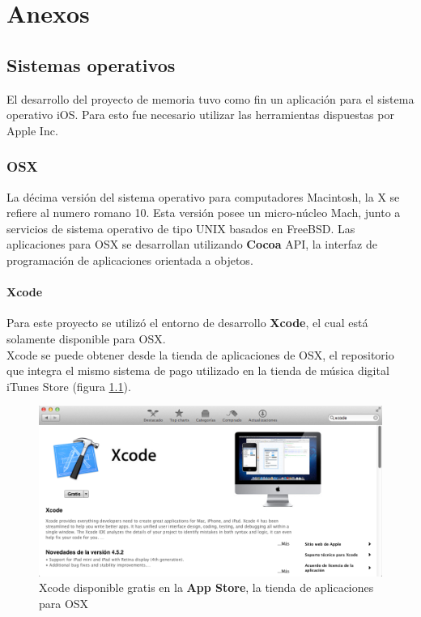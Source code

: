 \chapter{Anexos}
	\section{Sistemas operativos}
	El desarrollo del proyecto de memoria tuvo como fin un aplicación para el sistema operativo iOS. Para esto fue necesario utilizar las herramientas dispuestas por Apple Inc.
		\subsection{OSX}
La décima versión del sistema operativo para computadores Macintosh, la X se refiere al numero romano 10. Esta versión posee un micro-núcleo Mach, junto a servicios de sistema operativo de tipo UNIX basados en FreeBSD.
Las aplicaciones para OSX se desarrollan utilizando \textbf{Cocoa} API, la interfaz de programación de aplicaciones orientada a objetos.
\subsubsection{Xcode}
Para este proyecto se utilizó el entorno de desarrollo \textbf{Xcode}, el cual está solamente disponible para OSX.\\

Xcode se puede obtener desde la tienda de aplicaciones de OSX, el repositorio que integra el mismo sistema de pago utilizado en la tienda de música digital iTunes Store (figura \ref{fig:xcode-appstore}).
\begin{figure}[H]
	\centering
	\includegraphics[scale=0.41]{imgs/xcode-appstore.png} 
	\caption{Xcode disponible gratis en la \textbf{App Store}, la tienda de aplicaciones para OSX}
	\label{fig:xcode-appstore}
\end{figure}  

